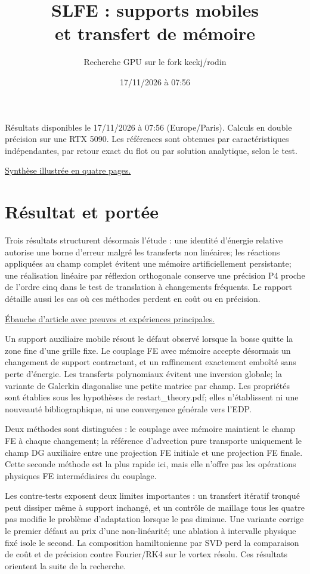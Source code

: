 \documentclass[10pt,a4paper]{article}
\title{SLFE : supports mobiles\\et transfert de mémoire}
\author{Recherche GPU sur le fork keckj/rodin}\date{17/11/2026 à 07:56}
\begin{document}
\maketitle
Résultats disponibles le 17/11/2026 à 07:56 (Europe/Paris). Calculs en double précision sur une RTX 5090. Les références sont obtenues par caractéristiques indépendantes, par retour exact du flot ou par solution analytique, selon le test.

\noindent\href{synthese_08h.pdf}{Synthèse illustrée en quatre pages.}\par
\section{Résultat et portée}
Trois résultats structurent désormais l'étude : une identité d'énergie relative autorise une borne d'erreur malgré les transferts non linéaires; les réactions appliquées au champ complet évitent une mémoire artificiellement persistante; une réalisation linéaire par réflexion orthogonale conserve une précision P4 proche de l'ordre cinq dans le test de translation à changements fréquents. Le rapport détaille aussi les cas où ces méthodes perdent en coût ou en précision.

\noindent\href{memory_paper_draft.pdf}{Ébauche d'article avec preuves et expériences principales.}\par
Un support auxiliaire mobile résout le défaut observé lorsque la bosse quitte la zone fine d'une grille fixe. Le couplage FE avec mémoire accepte désormais un changement de support contractant, et un raffinement exactement emboîté sans perte d'énergie. Les transferts polynomiaux évitent une inversion globale; la variante de Galerkin diagonalise une petite matrice par champ. Les propriétés sont établies sous les hypothèses de restart\_theory.pdf; elles n'établissent ni une nouveauté bibliographique, ni une convergence générale vers l'EDP.

Deux méthodes sont distinguées : le couplage avec mémoire maintient le champ FE à chaque changement; la référence d'advection pure transporte uniquement le champ DG auxiliaire entre une projection FE initiale et une projection FE finale. Cette seconde méthode est la plus rapide ici, mais elle n'offre pas les opérations physiques FE intermédiaires du couplage.

Les contre-tests exposent deux limites importantes : un transfert itératif tronqué peut dissiper même à support inchangé, et un contrôle de maillage tous les quatre pas modifie le problème d'adaptation lorsque le pas diminue. Une variante corrige le premier défaut au prix d'une non-linéarité; une ablation à intervalle physique fixé isole le second. La composition hamiltonienne par SVD perd la comparaison de coût et de précision contre Fourier/RK4 sur le vortex résolu. Ces résultats orientent la suite de la recherche.
\end{document}
